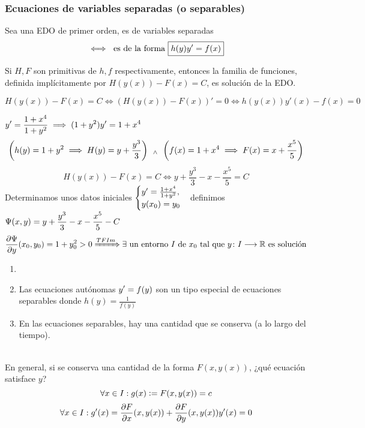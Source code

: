 \subsubsection{Ecuaciones de variables separadas (o separables)}
\begin{defn}
	Sea una EDO de primer orden, es de variables separadas
	\[\iff \text{ es de la forma } \boxed{h(y)y'=f(x)}\]
\end{defn}
\begin{prop}
	Si $H, F$ son primitivas de $h, f$ respectivamente, entonces la familia de funciones, definida implícitamente por $H(y(x))-F(x)=C$, es solución de la EDO.
	\begin{dem}
		\[H(y(x))-F(x)=C \iff \left(H(y(x))-F(x)\right)'=0 \iff h(y(x))y'(x)-f(x)=0\]
	\end{dem}
\end{prop}
\begin{ejem}
	$\displaystyle y'=\frac{1+x^4}{1+y^2} \implies (1+y^2)y'=1+x^4$
	\[\left(h(y)=1+y^2 \implies H(y)=y + \frac{y^3}{3}\right) \, \; _{\wedge} \; \, \left(f(x)=1+x^4 \implies F(x)=x+\frac{x^5}{5}\right)\]
	\[H(y(x))-F(x)=C \iff y + \frac{y^3}{3}-x-\frac{x^5}{5} = C\]
	Determinamos unos datos iniciales $\displaystyle \begin{cases}
		y'=\frac{1+x^4}{1+y^2}, \\
		y(x_0)=y_0
	\end{cases}$definimos $\displaystyle \Psi(x, y)=y + \frac{y^3}{3}-x-\frac{x^5}{5}-C$
	\[\frac{\partial\Psi}{\partial y}(x_0, y_0) = 1+ y_0^2>0 \xRightarrow{TFIm} \exists \text{ un entorno } I \text{ de } x_0 \text{ tal que } y \colon I \longrightarrow \mathbb{R} \text{ es solución}\]
\end{ejem}

\begin{obs}
	\begin{enumerate}
	\item[] 
		\item Las ecuaciones autónomas $\displaystyle y'=f(y)$ son un tipo especial de ecuaciones separables donde $h(y)=\frac{1}{f(y)}$
		\item En las ecuaciones separables, hay una cantidad que se conserva (a lo largo del tiempo).
	\end{enumerate}
\end{obs}

\\
En general, si se conserva una cantidad de la forma $F(x, y(x))$, ¿qué ecuación satisface $y$?
\[\forall x \in I : g(x)\vcentcolon= F(x, y(x))= c\]
\[\forall x \in I : g'(x)=\pdv{F}{x}(x,y(x)) + \pdv{F}{y}(x, y(x))y'(x)=0\] %
